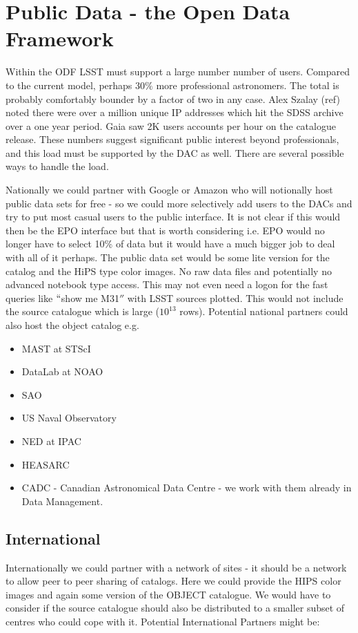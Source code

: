 \section{Public Data - the Open Data Framework}\label{sec:public}

Within the ODF LSST must support a large number number of users. Compared to the current model, perhaps 30$\%$ more professional astronomers. The total is probably comfortably bounder by a factor of two in any case.
Alex Szalay (ref) noted there were over a million unique IP addresses which hit the SDSS archive over a one year period.  Gaia saw 2K users accounts per hour on the catalogue release. These numbers suggest significant public interest beyond professionals, and this load must be supported by the DAC as well. There are several possible ways to handle the load. 

Nationally we could partner with Google or Amazon who will notionally host public data sets for free - so we could more selectively add users to the DACs and try to put most casual users to the public interface. It is not clear if this would then be the EPO interface but that is worth considering i.e. EPO would no longer have to select 10\% of data but it would have a much bigger job to deal with all of it perhaps.
The public data set would be some lite version for the catalog   and the HiPS type color images. No raw data files and potentially no advanced notebook type access. This may not even need a logon for the fast queries like $``$show me M31$''$ with LSST sources plotted. This would not include the source catalogue which is large ($10^{13}$ rows).
Potential national partners  could also host the object catalog e.g.

\begin{itemize}
 \item MAST at STScI
 \item DataLab at NOAO
 \item SAO
 \item US Naval Observatory
 \item NED at IPAC
 \item HEASARC
 \item CADC - Canadian Astronomical Data Centre - we work with them already in Data Management.
\end{itemize}

\subsection {International}
Internationally we could partner with a network of sites - it should be a network to allow peer to peer sharing of catalogs. Here we could provide the HIPS color images and again some version of the OBJECT catalogue. We would have to consider if the source catalogue should also be distributed to a smaller subset of centres who could cope with it.
Potential International Partners might be:

